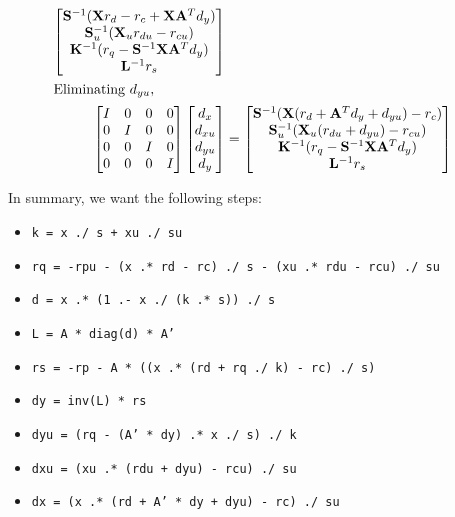 \documentclass[10pt,a4paper]{article}
\begin{document}
\begin{align*}
\begin{bmatrix}
\mathbf{S}^{-1}(\mathbf{X}r_d - r_c + \mathbf{X}\mathbf{A}^Td_y) \\
\mathbf{S}_u^{-1}(\mathbf{X}_ur_{du} - r_{cu}) \\
\mathbf{K}^{-1}(r_q - \mathbf{S}^{-1}\mathbf{X}\mathbf{A}^Td_y) \\
\mathbf{L}^{-1}r_s
\end{bmatrix} \\
\intertext{Eliminating $d_{yu}$,}
\begin{bmatrix}
I & 0 & 0 & 0 \\
0 & I & 0 & 0 \\
0 & 0 & I & 0 \\
0 & 0 & 0 & I
\end{bmatrix}
\begin{bmatrix}d_x \\ d_{xu} \\ d_{yu} \\ d_y\end{bmatrix} &= 
\begin{bmatrix}
\mathbf{S}^{-1}(\mathbf{X}(r_d + \mathbf{A}^Td_y + d_{yu}) - r_c) \\
\mathbf{S}_u^{-1}(\mathbf{X}_u(r_{du} + d_{yu}) - r_{cu}) \\
\mathbf{K}^{-1}(r_q - \mathbf{S}^{-1}\mathbf{X}\mathbf{A}^Td_y) \\
\mathbf{L}^{-1}r_s
\end{bmatrix}
\end{align*}

In summary, we want the following steps:
\begin{itemize}
\item \texttt{k = x ./ s + xu ./ su}
\item \texttt{rq = -rpu - (x .* rd - rc) ./ s - (xu .* rdu - rcu) ./ su}
\item \texttt{d = x .* (1 .- x ./ (k .* s)) ./ s}
\item \texttt{L = A * diag(d) * A'}
\item \texttt{rs = -rp - A * ((x .* (rd + rq ./ k) - rc) ./ s)}
\item \texttt{dy = inv(L) * rs}
\item \texttt{dyu = (rq - (A' * dy) .* x ./ s) ./ k}
\item \texttt{dxu = (xu .* (rdu + dyu) - rcu) ./ su}
\item \texttt{dx = (x .* (rd + A' * dy + dyu) - rc) ./ su}
\end{itemize}
\end{document}
